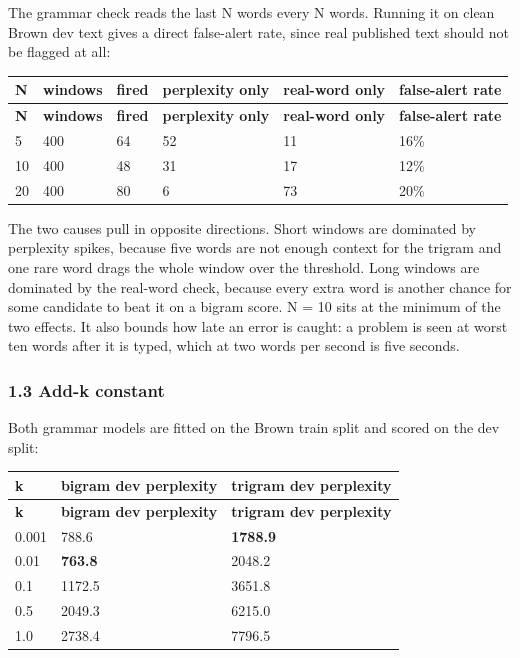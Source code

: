 \documentclass[11pt,a4paper]{article}
\begin{document}
The grammar check reads the last N words every N words. Running it on clean Brown dev text gives a direct false-alert rate, since real published text should not be flagged at all:

{\small
\setlength{\tabcolsep}{4pt}
\begin{longtable}{llllll}
\toprule
\textbf{N} & \textbf{windows} & \textbf{fired} & \textbf{perplexity only} & \textbf{real-word only} & \textbf{false-alert rate} \\
\midrule
\endfirsthead
\toprule
\textbf{N} & \textbf{windows} & \textbf{fired} & \textbf{perplexity only} & \textbf{real-word only} & \textbf{false-alert rate} \\
\midrule
\endhead
5 & 400 & 64 & 52 & 11 & 16\% \\
10 & 400 & 48 & 31 & 17 & 12\% \\
20 & 400 & 80 & 6 & 73 & 20\% \\
\bottomrule
\end{longtable}}

The two causes pull in opposite directions. Short windows are dominated by perplexity spikes, because five words are not enough context for the trigram and one rare word drags the whole window over the threshold. Long windows are dominated by the real-word check, because every extra word is another chance for some candidate to beat it on a bigram score. N = 10 sits at the minimum of the two effects. It also bounds how late an error is caught: a problem is seen at worst ten words after it is typed, which at two words per second is five seconds.

\subsubsection*{1.3 Add-k constant}

Both grammar models are fitted on the Brown train split and scored on the dev split:

{\small
\setlength{\tabcolsep}{4pt}
\begin{longtable}{lll}
\toprule
\textbf{k} & \textbf{bigram dev perplexity} & \textbf{trigram dev perplexity} \\
\midrule
\endfirsthead
\toprule
\textbf{k} & \textbf{bigram dev perplexity} & \textbf{trigram dev perplexity} \\
\midrule
\endhead
0.001 & 788.6 & \textbf{1788.9} \\
0.01 & \textbf{763.8} & 2048.2 \\
0.1 & 1172.5 & 3651.8 \\
0.5 & 2049.3 & 6215.0 \\
1.0 & 2738.4 & 7796.5 \\
\bottomrule
\end{longtable}}
\end{document}
